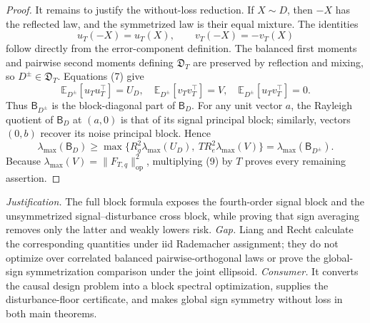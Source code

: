 \documentclass{article}
\begin{document}
\begin{proof}
It remains to justify the without-loss reduction.  If \(X\sim D\), then \(-X\) has the reflected law, and the symmetrized law is their equal mixture.  The identities
\[
u_T(-X)=u_T(X),
\qquad
v_T(-X)=-v_T(X)
\tag{7}
\]
follow directly from the error-component definition.  The balanced first moments and pairwise second moments defining \(\mathfrak D_T\) are preserved by reflection and mixing, so \(D^{\pm}\in\mathfrak D_T\).  Equations (7) give
\[
\mathbb E_{D^{\pm}}[u_Tu_T^{\top}]=U_D,
\quad
\mathbb E_{D^{\pm}}[v_Tv_T^{\top}]=V,
\quad
\mathbb E_{D^{\pm}}[u_Tv_T^{\top}]=0.
\tag{8}
\]
Thus \(\mathsf B_{D^{\pm}}\) is the block-diagonal part of \(\mathsf B_D\).  For any unit vector \(a\), the Rayleigh quotient of \(\mathsf B_D\) at \((a,0)\) is that of its signal principal block; similarly, vectors \((0,b)\) recover its noise principal block.  Hence
\[
\lambda_{\max}(\mathsf B_D)
\ge
\max\{R_g^2\lambda_{\max}(U_D),\ T R_e^2\lambda_{\max}(V)\}
=\lambda_{\max}(\mathsf B_{D^{\pm}}).
\tag{9}
\]
Because \(\lambda_{\max}(V)=\lVert F_{T,q}\rVert_{\mathrm{op}}^2\), multiplying (9) by \(T\) proves every remaining assertion.
\end{proof}
\par\smallskip\noindent \textit{Justification.} The full block formula exposes the fourth-order signal block and the unsymmetrized signal--disturbance cross block, while proving that sign averaging removes only the latter and weakly lowers risk. \textit{Gap.} Liang and Recht calculate the corresponding quantities under iid Rademacher assignment; they do not optimize over correlated balanced pairwise-orthogonal laws or prove the global-sign symmetrization comparison under the joint ellipsoid. \textit{Consumer.} It converts the causal design problem into a block spectral optimization, supplies the disturbance-floor certificate, and makes global sign symmetry without loss in both main theorems.
\end{document}
